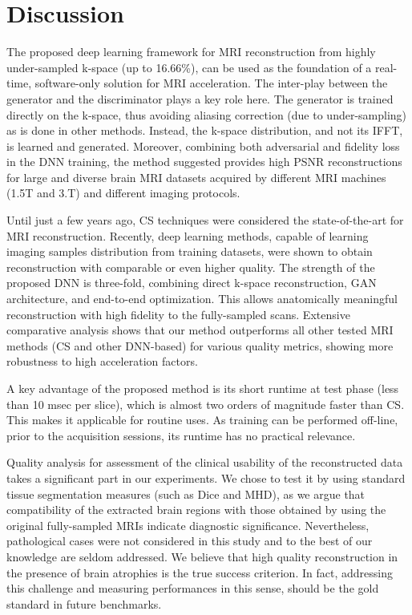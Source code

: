 \documentclass[10pt,journal,compsoc]{IEEEtran}
\begin{document}
\section{Discussion}\label{conclusions_section}
The proposed deep learning framework for MRI reconstruction from highly under-sampled k-space (up to 16.66\%), can be used as the foundation of a real-time, software-only solution for MRI acceleration.
The inter-play between the generator and the discriminator plays a key role here. The generator is trained directly on the k-space, thus avoiding aliasing correction (due to under-sampling) as is done in other methods.
Instead, the k-space distribution, and not its IFFT, is learned and generated. Moreover, combining both adversarial and fidelity loss in the DNN training, the method suggested provides high PSNR reconstructions for large and diverse brain MRI datasets acquired by different MRI machines (1.5T and 3.T) and different imaging protocols.

Until just a few years ago, CS techniques were considered the state-of-the-art for MRI reconstruction. Recently, deep learning methods, capable of learning imaging samples distribution from training datasets, were shown to obtain reconstruction with comparable or even higher quality. The strength of the proposed DNN is three-fold, combining direct k-space reconstruction, GAN architecture, and end-to-end optimization.
This allows anatomically meaningful reconstruction with high fidelity to the fully-sampled scans. Extensive comparative analysis shows that our method outperforms all other tested MRI methods (CS and other DNN-based) for various quality metrics, showing more robustness to high acceleration factors.

A key advantage of the proposed method is its short runtime at test phase (less than 10 msec per slice), which is almost two orders of magnitude faster than CS. This makes it applicable for routine uses. As training can be performed off-line, prior to the acquisition sessions, its runtime has no practical relevance.

Quality analysis for assessment of the clinical usability of the reconstructed data takes a significant part in our experiments.
We chose to test it by using standard tissue segmentation measures (such as Dice and MHD), as we argue that compatibility of the extracted brain regions with those obtained by using the original fully-sampled MRIs indicate diagnostic significance. Nevertheless, pathological cases were not considered in this study and to the best of our knowledge are seldom addressed. We believe that high quality reconstruction in the presence of brain atrophies is the true success criterion. In fact, addressing this challenge and measuring performances in this sense, should be the gold standard in future benchmarks.
\end{document}
